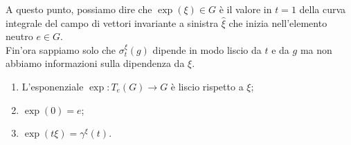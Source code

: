 A questo punto, possiamo dire che $ \exp(\xi) \in G $ è il valore in $ t=1 $ della curva integrale del campo di vettori invariante a sinistra $ \hat{\xi} $ che inizia nell'elemento neutro $ e \in G $.\\
Fin'ora sappiamo solo che $ \sigma_{t}^{\xi}(g) $ dipende in modo liscio da $ t $ e da $ g $ ma non abbiamo informazioni sulla dipendenza da $ \xi $.

\begin{definition}\hfill\break
	\begin{enumerate}
		\item L'esponenziale $ \exp : T_{e}(G) \to G $ è liscio rispetto a $ \xi $;
		
		\item $ \exp(0) = e $;
		
		\item $ \exp(t \xi) = \gamma^{\xi}(t) $.
	\end{enumerate}
\end{definition}

